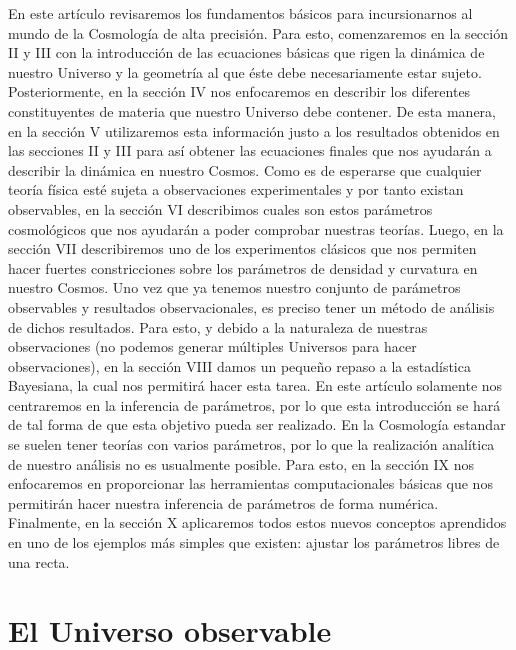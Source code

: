 \documentclass[10.5pt,prb,
               showpacs,            %
               preprintnumbers,     %
               aps,                 %
               prl,          	    %
               letterpaper,             %
               superscriptaddress,      %
               nofootinbib,         %
               tightenlines,        %
               floats,floatfix      %
               ,usenatbib]{revtex4-1}%
\begin{document}
En este art\'iculo revisaremos los fundamentos b\'asicos para incursionarnos al mundo de la Cosmolog\'ia de alta precisi\'on. Para esto, comenzaremos en la secci\'on II y III con la introducci\'on de las ecuaciones b\'asicas que rigen la din\'amica de nuestro Universo y la geometr\'ia al que \'este debe necesariamente estar sujeto. Posteriormente, en la secci\'on IV nos enfocaremos en describir los diferentes constituyentes de materia que nuestro Universo debe contener. De esta manera, en la secci\'on V utilizaremos esta informaci\'on justo a los resultados obtenidos en las secciones II y III para as\'i obtener las ecuaciones finales que nos ayudar\'an a describir la din\'amica en nuestro Cosmos. Como es de esperarse que cualquier teor\'ia f\'isica est\'e sujeta a observaciones experimentales y por tanto existan observables, en la secci\'on VI describimos cuales son estos par\'ametros cosmol\'ogicos que nos ayudar\'an a poder comprobar nuestras teor\'ias. Luego, en la secci\'on VII describiremos uno de los experimentos cl\'asicos que nos permiten hacer fuertes constricciones sobre los par\'ametros de densidad y curvatura en nuestro Cosmos. Uno vez que ya tenemos nuestro conjunto de par\'ametros observables y resultados observacionales, es preciso tener un m\'etodo de an\'alisis de dichos resultados. Para esto, y debido a la naturaleza de nuestras observaciones (no podemos generar m\'ultiples Universos para hacer observaciones), en la secci\'on VIII damos un peque\~no repaso a la estad\'istica Bayesiana, la cual nos permitir\'a hacer esta tarea. En este art\'iculo solamente nos centraremos en la inferencia de par\'ametros, por lo que esta introducci\'on se har\'a de tal forma de que esta objetivo pueda ser realizado. En la Cosmolog\'ia estandar se suelen tener teor\'ias con varios par\'ametros, por lo que la realizaci\'on anal\'itica de nuestro an\'alisis no es usualmente posible. Para esto, en la secci\'on IX nos enfocaremos en proporcionar las herramientas computacionales b\'asicas que nos permitir\'an hacer nuestra inferencia de par\'ametros de forma num\'erica. Finalmente, en la secci\'on X aplicaremos todos estos nuevos conceptos aprendidos en uno de los ejemplos m\'as simples que existen: ajustar los par\'ametros libres de una recta.

\section{El Universo observable}
\end{document}
